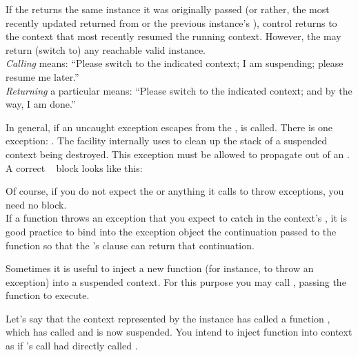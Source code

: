 If the \entryfn returns the same \cont instance it was originally
passed (or rather, the most recently updated \cont returned from \callcc or the
previous instance's \resume), control returns to the context that most
recently resumed the running context. However, the \entryfn may return (switch
to) any reachable valid \cont instance.\\

\emph{Calling} \contresume means: ``Please switch to the indicated context; I
am suspending; please resume me later.''\\

\emph{Returning} a particular \cont means: ``Please switch to the indicated
context; and by the way, I am done.''


\label{subsec:exceptions}

In general, if an uncaught exception escapes from the \entryfn,
 is called. There is one exception: \unwindex. The \callcc
facility internally uses \unwindex to clean up the stack of a suspended context
being destroyed. This exception must be allowed to propagate out of an \entryfn.\\

A correct \entryfn\  block looks like this:

Of course, if you do not expect the \entryfn or anything it calls to throw
exceptions, you need no  block.\\

If a \resumewith function throws an exception that you expect to catch in the
context's \entryfn, it is good practice to bind into the exception object the
continuation passed to the \resumewith function so that
the \entryfn's  clause can return that continuation.


\label{subsec:resumewith}

Sometimes it is useful to inject a new function (for instance, to throw an
exception) into a suspended context. For this purpose you may call
, passing the function  to execute.

Let's say that the context represented by the \cont instance  has
called a function , which has called \contresume and is now
suspended. You intend to inject function  into context  as
if 's \resume call had directly called .\\

